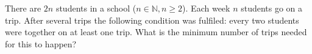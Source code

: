 There are \(2n\) students in a school (\(n \in \mathbb{N},n \geqslant 2\)). Each week \(n\) students go on a trip. After several trips the following condition was fulfiled: every two students were together on at least one trip. What is the minimum number of trips needed for this to happen?

